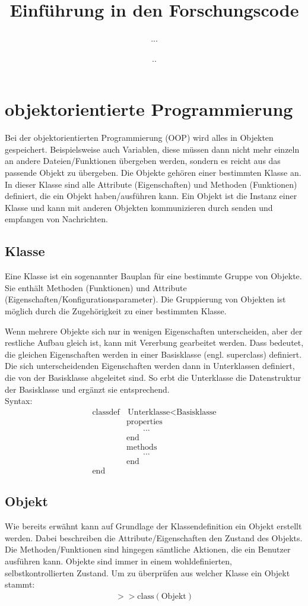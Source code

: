 \documentclass[12pt,bibstyle=none,pagenumberinfooter]{ifmdocument}
\author{...}
\title{Einf\"uhrung in den Forschungscode}
\date{\the\day.\the\month.\the\year}
\begin{document}
	\maketitle
	\section{objektorientierte Programmierung}
	Bei der objektorientierten Programmierung (OOP) wird alles in Objekten gespeichert. Beispielsweise auch Variablen, diese m\"ussen dann nicht mehr einzeln an andere Dateien/Funktionen übergeben werden, sondern es reicht aus das passende Objekt zu \"ubergeben. Die Objekte geh\"oren einer bestimmten Klasse an. In dieser Klasse sind alle Attribute (Eigenschaften) und Methoden (Funktionen) definiert, die ein Objekt haben/ausführen kann. Ein Objekt ist die Instanz einer Klasse und kann mit anderen Objekten kommunizieren durch senden und empfangen von Nachrichten.
	\subsection{Klasse}
	Eine Klasse ist ein sogenannter Bauplan f\"ur eine bestimmte Gruppe von Objekte. Sie enth\"alt Methoden (Funktionen) und Attribute (Eigenschaften/Konfigurationsparameter). 
	Die Gruppierung von Objekten ist m\"oglich durch die Zugeh\"origkeit zu einer bestimmten Klasse. 
	
	Wenn mehrere Objekte sich nur in wenigen Eigenschaften unterscheiden, aber der restliche Aufbau gleich ist, kann mit Vererbung gearbeitet werden. Dass bedeutet, die gleichen Eigenschaften werden in einer Basisklasse (engl. superclass) definiert. Die sich unterscheidenden Eigenschaften werden dann in Unterklassen definiert, die von der Basisklasse abgeleitet sind. So erbt die Unterklasse die Datenstruktur der Basisklasse und erg\"anzt sie entsprechend.\\
	Syntax: 
	\begin{align*}
		\text{classdef}& \,\text{Unterklasse} < \text{Basisklasse}  \\
		&\text{properties}\\
		& \qquad \ldots \\
		&\text{end}\\
		&\text{methods}\\
		&\qquad	\ldots \\
		&\text{end}\\
		\text{end} \quad &
	\end{align*}	
	\subsection{Objekt}
	Wie bereits erw\"ahnt kann auf Grundlage der Klassendefinition ein Objekt erstellt werden. Dabei beschreiben die Attribute/Eigenschaften den Zustand des Objekts. Die Methoden/Funktionen sind hingegen s\"amtliche Aktionen, die ein Benutzer ausf\"uhren kann. Objekte sind immer in einem wohldefinierten, selbstkontrollierten Zustand. 
	Um zu überprüfen aus welcher Klasse ein Objekt stammt:
	\begin{gather*}
	>> \text{class}(\text{Objekt})
	\end{gather*}
\end{document}
